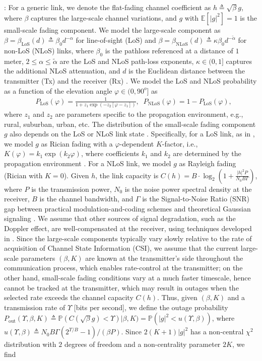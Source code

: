 \documentclass[12pt, draftcls, onecolumn]{IEEEtran}
\theoremstyle{plain}
\theoremstyle{definition}
\theoremstyle{remark}
\begin{document}
: For a generic link, we denote the flat-fading channel coefficient as $h{\triangleq}\sqrt{\beta}g$, where $\beta$ captures the large-scale channel variations, and $g$ with $\mathbb{E}\left[|g|^2\right]{=}1$ is the small-scale fading component. We model the large-scale component as $\beta{=}\beta_{\mathrm{LoS}}(d){\triangleq}\beta_{0}d^{-\alpha}$ for line-of-sight (LoS) and $\beta{=}\beta_{\mathrm{NLoS}}(d){\triangleq}\kappa\beta_{0}d^{-\tilde{\alpha}}$ for non-LoS (NLoS) links, where $\beta_{0}$ is the pathloss referenced at a distance of $1$ meter, $2{\leq}\alpha{\leq}\tilde{\alpha}$ are the LoS and NLoS path-loss exponents, $\kappa{\in}(0,1]$ captures the additional NLoS attenuation, and $d$ is the Euclidean distance between the transmitter (Tx) and the receiver (Rx) \cite{SCA}. We model the LoS and NLoS probability as a function of the elevation angle $\varphi{\in}(0,90^{o}]$ as \cite{LAP}
\begin{align}\label{eq:PLoS}
	&P_{\mathrm{LoS}}(\varphi)=\frac{1}{1+z_{1}\exp\left(-z_{2}\left[\varphi-z_{1}\right]\right)},\;\;
	P_{\mathrm{NLoS}}(\varphi)=1-P_{\mathrm{LoS}}(\varphi),
\end{align}
where $z_{1}$ and $z_{2}$ are parameters specific to the propagation environment, e.g., rural, suburban, urban, etc. The distribution of the small-scale fading component $g$ also depends on the LoS or NLoS link state \cite{WCBook}. Specifically, for a LoS link, as in \cite{Rician}, we model $g$ as Rician fading with a $\varphi$-dependent $K$-factor, i.e., $K(\varphi){=}k_{1}\exp\left(k_{2}\varphi\right)$, where coefficients $k_{1}$ and $k_{2}$ are determined by the propagation environment \cite{Rician}. For a NLoS link, we model $g$ as Rayleigh fading \cite{WCBook} (Rician with $K{=}0$). Given $h$, the link capacity is $C(h){=}B{\cdot}\log_{2}\left(1{+}\frac{|h|^{2}P}{N_{0}B\Gamma} \right)$, where $P$ is the transmission power, $N_{0}$ is the noise power spectral density at the receiver, $B$ is the channel bandwidth,
and $\Gamma$ is the Signal-to-Noise Ratio (SNR) gap between practical modulation-and-coding schemes and theoretical Gaussian signaling \cite{Rician}. We assume that other sources of signal degradation, such as the Doppler effect, are well-compensated at the receiver, using techniques developed in \cite{Doppler}. Since the large-scale components typically vary slowly relative to the rate of acquisition of Channel State Information (CSI), we assume that the current large-scale parameters $(\beta,K)$ are known at the transmitter's side throughout the communication process, which enables rate-control at the transmitter; on the other hand, small-scale fading conditions vary at a much faster timescale, hence cannot be tracked at the transmitter, which may result in outages when the selected rate exceeds the channel capacity $C(h)$. Thus, given $(\beta,K)$ and a transmission rate of $\Upsilon$ [bits per second], we define the outage probability $P_{\mathrm{out}}(\Upsilon,\beta,K) \triangleq \mathbb{P}(C(\sqrt{\beta}g){<}\Upsilon)|\beta,K) = \mathbb{P}\left(|g|^{2}{<}u(\Upsilon,\beta)\right)$, where $u(\Upsilon,\beta){\triangleq}N_{0}B\Gamma(2^{\Upsilon/B}{-}1)/(\beta P)$. Since $2(K{+}1)|g|^{2}$ has a non-central $\chi^2$ distribution with $2$ degrees of freedom and a non-centrality parameter $2K$, we find
\end{document}
